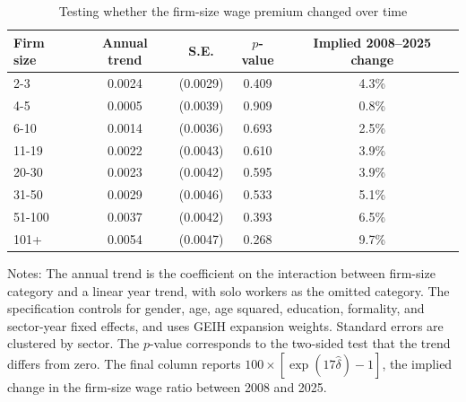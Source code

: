 \begin{table}[htbp]
  \centering
  \caption{Testing whether the firm-size wage premium changed over time}
  \label{tab:firm-size-premium-trend-test}
  \small
  \begin{tabular}{lcccc}
    \toprule
    Firm size & Annual trend & S.E. & $p$-value & Implied 2008--2025 change \\
    \midrule
    2-3 & 0.0024 & (0.0029) & 0.409 & 4.3\% \\
    4-5 & 0.0005 & (0.0039) & 0.909 & 0.8\% \\
    6-10 & 0.0014 & (0.0036) & 0.693 & 2.5\% \\
    11-19 & 0.0022 & (0.0043) & 0.610 & 3.9\% \\
    20-30 & 0.0023 & (0.0042) & 0.595 & 3.9\% \\
    31-50 & 0.0029 & (0.0046) & 0.533 & 5.1\% \\
    51-100 & 0.0037 & (0.0042) & 0.393 & 6.5\% \\
    101+ & 0.0054 & (0.0047) & 0.268 & 9.7\% \\
    \bottomrule
  \end{tabular}
  \vspace{0.3em}
  \begin{minipage}{0.95\textwidth}
  \footnotesize
  Notes: The annual trend is the coefficient on the interaction between firm-size category and a linear year trend, with solo workers as the omitted category. The specification controls for gender, age, age squared, education, formality, and sector-year fixed effects, and uses GEIH expansion weights. Standard errors are clustered by sector. The $p$-value corresponds to the two-sided test that the trend differs from zero. The final column reports $100\times[\exp(17\hat{\delta})-1]$, the implied change in the firm-size wage ratio between 2008 and 2025.
  \end{minipage}
\end{table}
